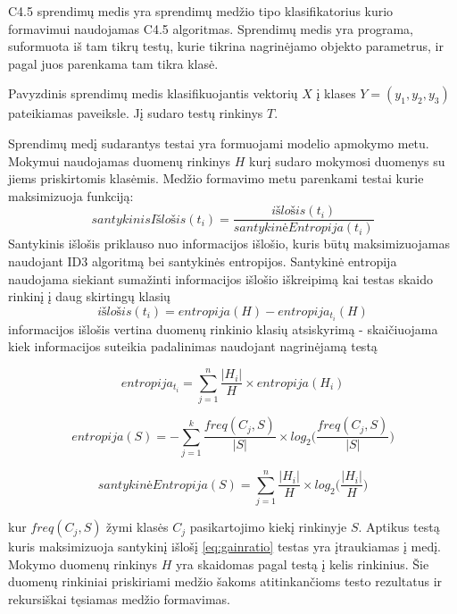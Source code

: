 C4.5 sprendimų medis yra sprendimų medžio tipo klasifikatorius kurio formavimui naudojamas C4.5 algoritmas.
Sprendimų medis yra programa, suformuota iš tam tikrų testų, kurie tikrina nagrinėjamo objekto parametrus,
ir pagal juos parenkama tam tikra klasė.


Pavyzdinis sprendimų medis klasifikuojantis vektorių $X$ į klases $Y = (y_1, y_2, y_3)$ pateikiamas
  paveiksle. Jį sudaro testų rinkinys $T$.

Sprendimų medį sudarantys testai yra formuojami modelio apmokymo metu. Mokymui naudojamas duomenų
rinkinys $H$ kurį sudaro mokymosi duomenys su jiems priskirtomis klasėmis. Medžio formavimo metu
parenkami testai kurie maksimizuoja funkciją:
\begin{equation} \label{eq:gainratio}
    santykinisIšlošis(t_i) = \frac{išlošis(t_i)}{santykinėEntropija(t_i)}
\end{equation}
Santykinis išlošis priklauso nuo informacijos išlošio, kuris būtų maksimizuojamas naudojant ID3
algoritmą bei santykinės entropijos. Santykinė entropija naudojama siekiant sumažinti informacijos
išlošio iškreipimą kai testas skaido rinkinį į daug skirtingų klasių \cite{c45}
\begin{equation}
    išlošis(t_i) = entropija(H) - entropija_{t_i}(H)
\end{equation}
informacijos išlošis vertina duomenų rinkinio klasių atsiskyrimą - skaičiuojama kiek informacijos
suteikia padalinimas naudojant nagrinėjamą testą

\begin{equation}
    entropija_{t_i} = \sum_{j=1}^{n} \frac{|H_i|}{H} \times entropija(H_i)
\end{equation}

\begin{equation}
    entropija(S) = - \sum_{j=1}^{k} \frac{freq(C_j, S)}{|S|} \times log_2 \big( \frac{freq(C_j, S)}{|S|} \big)
\end{equation}

\begin{equation}
    santykinėEntropija(S) =  \sum_{j=1}^{n} \frac{|H_i|}{H} \times log_2 \big( \frac{|H_i|}{H} \big)
\end{equation}

kur $freq(C_j, S)$ žymi klasės $C_j$ pasikartojimo kiekį rinkinyje $S$.
Aptikus testą kuris maksimizuoja santykinį išlošį \ref{eq:gainratio} testas yra įtraukiamas į medį.
Mokymo duomenų rinkinys $H$ yra skaidomas pagal testą į kelis rinkinius\cite{c45}. Šie duomenų
rinkiniai priskiriami medžio šakoms atitinkančioms testo rezultatus ir rekursiškai tęsiamas medžio formavimas.

